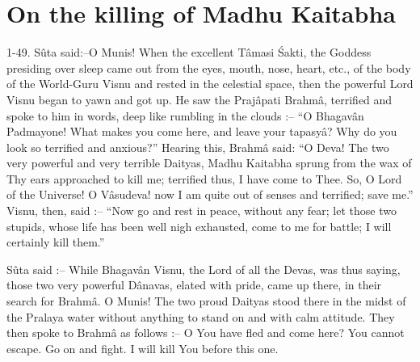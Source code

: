 \chapter{On the killing of Madhu Kaitabha}

1-49. S\^uta said:--O Munis! When the excellent T\^amasi \'Sakti, the Goddess presiding over sleep came out from the eyes, mouth, nose, heart, etc., of the body of the World-Guru Visnu and rested in the celestial space, then the powerful Lord Visnu began to yawn and got up. He saw the Praj\^apati Brahm\^a, terrified and spoke to him in words, deep like rumbling in the clouds :-- ``O Bhagav\^an Padmayone! What makes you come here, and leave your tapasy\^a? Why do you look so terrified and anxious?'' Hearing this, Brahm\^a said: ``O Deva! The two very powerful and very terrible Daityas, Madhu Kaitabha sprung from the wax of Thy ears approached to kill me; terrified thus, I have come to Thee. So, O Lord of the Universe! O V\^asudeva! now I am quite out of senses and terrified; save me.'' Visnu, then, said :-- ``Now go and rest in peace, without any fear; let those two stupids, whose life has been well nigh exhausted, come to me for battle; I will certainly kill them.''

S\^uta said :-- While Bhagav\^an Visnu, the Lord of all the Devas, was thus saying, those two very powerful D\^anavas, elated with pride, came up there, in their search for Brahm\^a. O Munis! The two proud Daityas stood there in the midst of the Pralaya water without anything to stand on and with calm attitude. They then spoke to Brahm\^a as follows :-- O You have fled and come here? You cannot escape. Go on and fight. I will kill You before this one.

